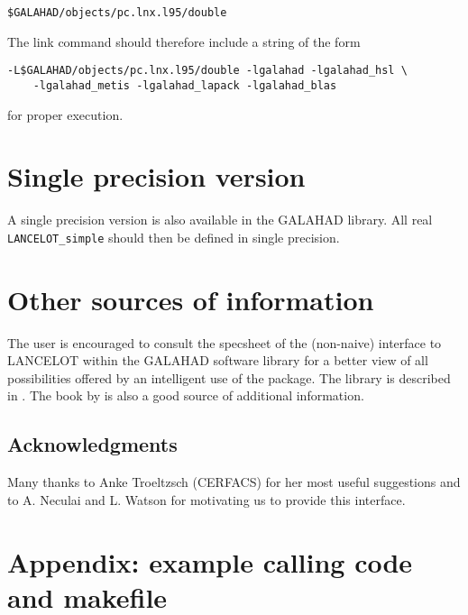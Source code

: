 \documentclass{article}
\begin{document}
\begin{lstlisting}[style=cshstyle]
    $GALAHAD/objects/pc.lnx.l95/double
\end{lstlisting}
\noindent
The link command should therefore include a string of the form

\begin{lstlisting}[style=cshstyle]
   -L$GALAHAD/objects/pc.lnx.l95/double -lgalahad -lgalahad_hsl \
    -lgalahad_metis -lgalahad_lapack -lgalahad_blas
\end{lstlisting}
\noindent
for proper execution.

\section{Single precision  version}

A single precision version is also available in the {\sf GALAHAD} library. All
real {\tt LANCELOT\_simple} should then be defined in single precision.

\section{Other sources of information}

The user is encouraged to consult the specsheet of the (non-naive)
interface to {\sf LANCELOT} within the {\sf GALAHAD} software library for a
better view of all possibilities offered by an intelligent use of the package.
The library is described in \citebb{GoulOrbaToin03b}.  The book by
\citebb{ConnGoulToin92} is also a good source of additional information.

{\footnotesize
\subsection*{Acknowledgments}

Many thanks to Anke Troeltzsch (CERFACS) for her most useful suggestions and to
A. Neculai and L. Watson for motivating us to provide this interface.
}




\appendix
\section*{Appendix: example calling code and makefile}
\end{document}
